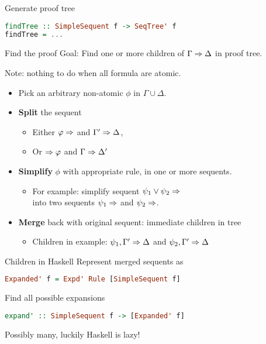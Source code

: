 \documentclass{beamer}
\begin{document}
\begin{frame}[fragile]{Generate proof tree}
		\begin{lstlisting}[language=haskell]
findTree :: SimpleSequent f -> SeqTree' f
findTree = ...
\end{lstlisting}
\end{frame}

\begin{frame}{Find the proof}
	Goal: Find one or more children of $\Gamma\Rightarrow\Delta$ in proof tree.
	\pause

	\vspace{1em}
	Note: nothing to do when all formula are atomic.
	\vspace{1em}


	\begin{itemize}
		\item Pick an arbitrary non-atomic $\phi$ in $\Gamma \cup \Delta$.
		\item \textbf{Split} the sequent
		\begin{itemize}
			\item Either $\varphi\Rightarrow$ and $\Gamma'\Rightarrow\Delta$, \\
		    \item Or $\Rightarrow\varphi$ and $\Gamma\Rightarrow\Delta'$
		\end{itemize}
		\pause
		\item\textbf{Simplify} $\phi$ with appropriate rule, in one or more sequents.
		\begin{itemize}
			\item For example: simplify sequent $\psi_1 \lor \psi_2\Rightarrow$ \\  into two sequents $\psi_1\Rightarrow$ and $\psi_2\Rightarrow$.
		\end{itemize}
		\pause
		\item \textbf{Merge} back with original sequent: immediate children in tree
		\begin{itemize}
			\item Children in example: $\psi_1, \Gamma'\Rightarrow\Delta$ and $\psi_2, \Gamma'\Rightarrow\Delta$
		\end{itemize}
	\end{itemize}
\end{frame}

\begin{frame}[fragile]{Children in Haskell}
	Represent merged sequents as

	\begin{lstlisting}[language=haskell]
Expanded' f = Expd' Rule [SimpleSequent f]
\end{lstlisting}

Find all possible expansions
\begin{lstlisting}[language=haskell]
expand' :: SimpleSequent f -> [Expanded' f]
\end{lstlisting}
\pause
Possibly many, luckily Haskell is lazy!

\end{frame}
\end{document}

